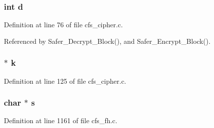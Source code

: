 \subsubsection{\setlength{\rightskip}{0pt plus 5cm}int {\bf d}}\label{cfs__cipher_8c_a1}




Definition at line 76 of file cfs\_\-cipher.c.

Referenced by Safer\_\-Decrypt\_\-Block(), and Safer\_\-Encrypt\_\-Block().
\subsubsection{$\ast$ {\bf k}}\label{cfs__cipher_8c_a2}




Definition at line 125 of file cfs\_\-cipher.c.
\subsubsection{\setlength{\rightskip}{0pt plus 5cm}char $\ast$ {\bf s}}\label{cfs__cipher_8c_a0}




Definition at line 1161 of file cfs\_\-fh.c.